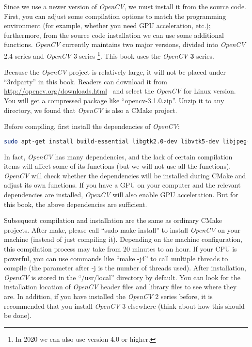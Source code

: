 Since we use a newer version of \textit{OpenCV}, we must install it from the source code. First, you can adjust some compilation options to match the programming environment (for example, whether you need GPU acceleration, etc.); furthermore, from the source code installation we can use some additional functions. \textit{OpenCV} currently maintains two major versions, divided into \textit{OpenCV} 2.4 series and \textit{OpenCV} 3 series \footnote{In 2020 we can also use version 4.0 or higher.}. This book uses the \textit{OpenCV} \textbf {3} series.

Because the \textit{OpenCV} project is relatively large, it will not be placed under ``3rdparty'' in this book. Readers can download it from ~ \url{http://opencv.org/downloads.html}~ and select the \textit{OpenCV} for Linux version. You will get a compressed package like ``opencv-3.1.0.zip''. Unzip it to any directory, we found that \textit{OpenCV} is also a CMake project.

Before compiling, first install the dependencies of \textit{OpenCV}:
\begin{lstlisting}[language=sh, caption=Terminal input:]
sudo apt-get install build-essential libgtk2.0-dev libvtk5-dev libjpeg-dev libtiff4-dev libjasper-dev libopenexr-dev libtbb-dev
\end{lstlisting}

In fact, \textit{OpenCV} has many dependencies, and the lack of certain compilation items will affect some of its functions (but we will not use all the functions). \textit{OpenCV} will check whether the dependencies will be installed during CMake and adjust its own functions. If you have a GPU on your computer and the relevant dependencies are installed, \textit{OpenCV} will also enable GPU acceleration. But for this book, the above dependencies are sufficient.

Subsequent compilation and installation are the same as ordinary CMake projects. After make, please call ``sudo make install'' to install \textit{OpenCV} on your machine (instead of just compiling it). Depending on the machine configuration, this compilation process may take from 20 minutes to an hour. If your CPU is powerful, you can use commands like ``make -j4'' to call multiple threads to compile (the parameter after -j is the number of threads used). After installation, \textit{OpenCV} is stored in the ``/usr/local'' directory by default. You can look for the installation location of \textit{OpenCV} header files and library files to see where they are. In addition, if you have installed the \textit{OpenCV} 2 series before, it is recommended that you install \textit{OpenCV} 3 elsewhere (think about how this should be done).

